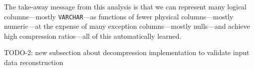 The take-away message from this analysis is that we can represent many logical columns---mostly \verb|VARCHAR|---as functions of fewer physical columns---mostly numeric---at the expense of many exception columns---mostly nulls---and achieve high compression ratios---all of this automatically learned.

TODO-2: new subsection about decompression implementation to validate input data reconstruction

